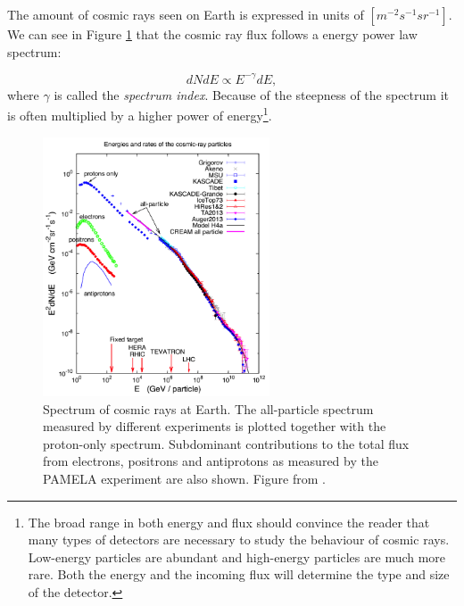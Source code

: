 The amount of cosmic rays seen on Earth is expressed in units of $\left[m^{-2} s^{-1} sr^{-1}\right]$. We can see in Figure \ref{fig:spectrumCR} that the cosmic ray flux follows a energy power law spectrum:

\begin{equation}
\label{eq:spectrum}
dNdE \varpropto E^{-\gamma} dE,
\end{equation} 
where $\gamma$ is called the \textit{spectrum index}. Because of the steepness of the spectrum it is often multiplied by a higher power of energy\footnote{The broad range in both energy and flux should convince the reader that many types of detectors are necessary to study the behaviour of cosmic rays. Low-energy particles are abundant and high-energy particles are much more rare. Both the energy and the incoming flux will determine the type and size of the detector.}.

\begin{figure}
\centering
\includegraphics[width = 0.6\textwidth]{chapter3/img/spectrumCR.png}
\caption{Spectrum of cosmic rays at Earth. The all-particle spectrum measured by different experiments is plotted together with the proton-only spectrum. Subdominant contributions to the total flux from electrons, positrons and antiprotons as measured by the PAMELA experiment are also shown. Figure from \cite{Blasi:2013rva}.}
\label{fig:spectrumCR}
\end{figure}

